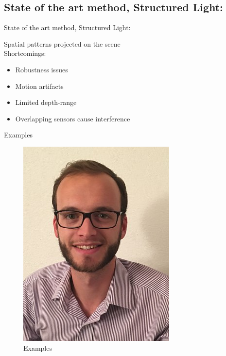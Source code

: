 \subsection{State of the art method, Structured Light:}
\begin{frame}{State of the art method, Structured Light:}

Spatial patterns projected on the scene\\
Shortcomings:
\begin{itemize}
\item Robustness issues
\item Motion artifacts
\item Limited depth-range
\item Overlapping sensors cause interference
\end{itemize}

\end{frame}

\begin{frame}{Examples}
\begin{figure}
\includegraphics[scale=0.9]{pictures/polop}
\caption{Examples}
\end{figure}
\end{frame}


